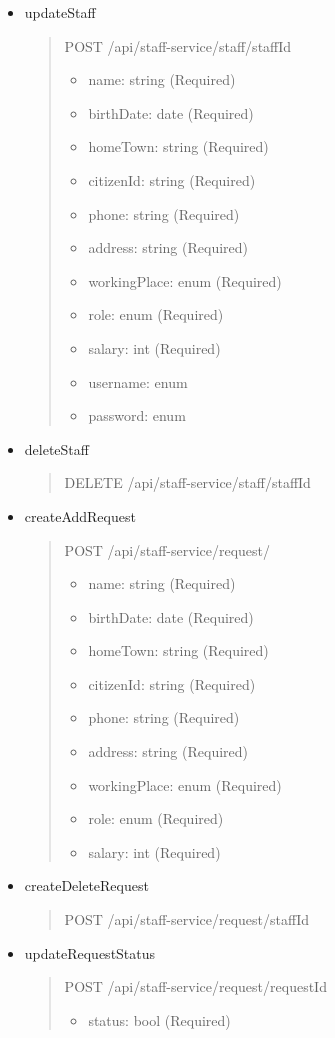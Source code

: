 \begin{itemize}
	\item updateStaff
	\begin{quote}
		POST /api/staff-service/staff/{staffId}
		\begin{itemize}
			\item name: string (Required)
			\item birthDate: date (Required)
			\item homeTown: string (Required)
			\item citizenId: string (Required)
			\item phone: string (Required)
			\item address: string (Required)
			\item workingPlace: enum (Required)
			\item role: enum (Required)
			\item salary: int (Required)
			\item username: enum
			\item password: enum
		\end{itemize}
	\end{quote}

	\item deleteStaff
	\begin{quote}
		DELETE /api/staff-service/staff/{staffId}
	\end{quote}

	\item createAddRequest
	\begin{quote}
		POST /api/staff-service/request/
		\begin{itemize}
			\item name: string (Required)
			\item birthDate: date (Required)
			\item homeTown: string (Required)
			\item citizenId: string (Required)
			\item phone: string (Required)
			\item address: string (Required)
			\item workingPlace: enum (Required)
			\item role: enum (Required)
			\item salary: int (Required)
		\end{itemize}
	\end{quote}

	\item createDeleteRequest
	\begin{quote}
		POST /api/staff-service/request/{staffId}
	\end{quote}

	\item updateRequestStatus
	\begin{quote}
		POST /api/staff-service/request/{requestId}
		\begin{itemize}
			\item status: bool (Required)
		\end{itemize}
	\end{quote}

\end{itemize}

